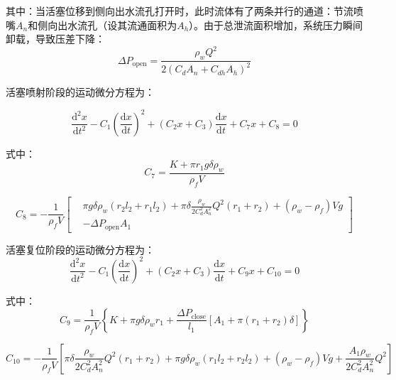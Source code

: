  
 其中：当活塞位移到侧向出水流孔打开时，此时流体有了两条并行的通道：节流喷嘴$A_n$和侧向出水流孔（设其流通面积为$A_h$）。由于总泄流面积增加，系统压力瞬间卸载，导致压差下降：
 \begin{equation}\label{eq:deltaP_open}
\Delta P_{\mathrm{open}}=\frac{\rho_w Q^2}{2\left(C_d A_n + C_{dh} A_h\right)^2}
\end{equation}

 活塞喷射阶段的运动微分方程为：
 
  \begin{equation}\label{eq:piston_dynamic2}
\frac{\mathrm{d}^2 x}{\mathrm{d}t^2}-C_1\left(\frac{\mathrm{d}x}{\mathrm{d}t}\right)^2 +(C_2 x+C_3)\frac{\mathrm{d}x}{\mathrm{d}t}+C_7 x +C_8=0
\end{equation}

  式中：
  \begin{equation}\label{eq:C7}
C_7=\frac{K+\pi r_1 g \delta \rho_w}{\rho_f V}
\end{equation}


  \begin{equation}\label{eq:C8}
C_8 = -\frac{1}{\rho_f V}
\left[
\begin{aligned}
&\pi g \delta \rho_w (r_2 l_2 + r_1 l_2) + \pi \delta \frac{\rho_w}{2C_d^2 A_n^2} Q^2 (r_1 + r_2) + (\rho_w - \rho_f) V g \\
&- \Delta P_{\mathrm{open}} A_1
\end{aligned}
\right]
\end{equation}

活塞复位阶段的运动微分方程为：
\begin{equation}\label{eq:piston_dynamic3}
\frac{\mathrm{d}^2 x}{\mathrm{d}t^2}-C_1\left(\frac{\mathrm{d}x}{\mathrm{d}t}\right)^2 +(C_2 x+C_3)\frac{\mathrm{d}x}{\mathrm{d}t}+C_9 x +C_{10}=0
\end{equation}



式中：
\begin{equation}\label{eq:C9}
C_9 = \frac{1}{\rho_f V}
\left\{
K + \pi g \delta \rho_w r_1
+ \frac{\Delta P_{\mathrm{close}}}{l_1}
\left[ A_1 + \pi (r_1 + r_2)\delta \right]
\right\}
\end{equation}

\begin{equation}\label{eq:C10}
C_{10} = -\frac{1}{\rho_f V}
\left[
\pi\delta \frac{\rho_w}{2C_d^2 A_n^2} Q^2 (r_1+r_2)
+ \pi g \delta \rho_w (r_1 l_2 + r_2 l_2)
+ (\rho_w-\rho_f) V g
+ \frac{A_1 \rho_w}{2C_d^2 A_n^2} Q^2
\right]
\end{equation}


